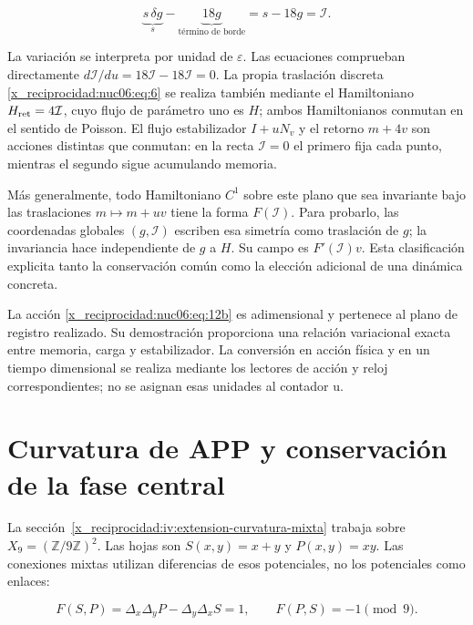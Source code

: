 \begin{equation}
\underbrace{s\,\delta g}_{s}
-\underbrace{18g}_{\text{término de borde}}
=s-18g=\mathcal I.
\label{x_reciprocidad:nuc06:eq:12c}
\end{equation}

La variación se interpreta por unidad de \(\varepsilon\). Las ecuaciones comprueban directamente \(d\mathcal I/du=18\mathcal I-18\mathcal I=0\). La propia traslación discreta \eqref{x_reciprocidad:nuc06:eq:6} se realiza también mediante el Hamiltoniano \(H_{\rm ret}=4\mathcal I\), cuyo flujo de parámetro uno es \(H\); ambos Hamiltonianos conmutan en el sentido de Poisson. El flujo estabilizador \(I+uN_v\) y el retorno \(m+4v\) son acciones distintas que conmutan: en la recta \(\mathcal I=0\) el primero fija cada punto, mientras el segundo sigue acumulando memoria.

Más generalmente, todo Hamiltoniano \(C^1\) sobre este plano que sea invariante bajo las traslaciones \(m\mapsto m+uv\) tiene la forma \(F(\mathcal I)\). Para probarlo, las coordenadas globales \((g,\mathcal I)\) escriben esa simetría como traslación de \(g\); la invariancia hace independiente de \(g\) a \(H\). Su campo es \(F'(\mathcal I)v\). Esta clasificación explicita tanto la conservación común como la elección adicional de una dinámica concreta.

La acción \eqref{x_reciprocidad:nuc06:eq:12b} es adimensional y pertenece al plano de registro realizado. Su demostración proporciona una relación variacional exacta entre memoria, carga y estabilizador. La conversión en acción física y en un tiempo dimensional se realiza mediante los lectores de acción y reloj correspondientes; no se asignan esas unidades al contador u.

\section{Curvatura de APP y conservación de la fase central}

La sección~\ref{x_reciprocidad:iv:extension-curvatura-mixta} trabaja sobre \(X_9=(\mathbb Z/9\mathbb Z)^2\). Las hojas son \(S(x,y)=x+y\) y \(P(x,y)=xy\). Las conexiones mixtas utilizan diferencias de esos potenciales, no los potenciales como enlaces:

\begin{equation}
F(S,P)=\Delta_x\Delta_yP-\Delta_y\Delta_xS=1,
\qquad F(P,S)=-1\pmod9.
\label{x_reciprocidad:nuc06:eq:13}
\end{equation}

